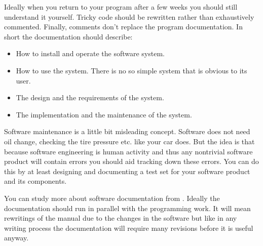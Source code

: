 Ideally when you  return to your program after a  few weeks you should
still understand it yourself.   Tricky code should be rewritten rather
than  exhaustively commented.   Finally, comments  don't  replace the
program  documentation. In short the documentation should describe:

\begin{itemize}
  \item How to install and operate the software system.
  \item How to use the system. There is no so simple system that is
  obvious to its user.
  \item The design and the requirements of the system.
  \item The implementation and the maintenance of the system.
\end{itemize} 

Software maintenance is a little bit misleading concept. Software does
not need  oil change,  checking the tire  pressure etc. like  your car
does.   But the  idea is  that because  software engineering  is human
activity and thus any  nontrivial software product will contain errors
you should  aid tracking  down these  errors.  You can  do this  by at
least designing and  documenting a test set for  your software product
and its components. 

You    can   study    more   about    software    documentation   from
\cite{Som85}. Ideally  the documentation should run  in parallel with
the programming  work.  It will mean  rewritings of the  manual due to
the  changes in  the  software but  like  in any  writing process  the
documentation will require many revisions before it is useful anyway.







